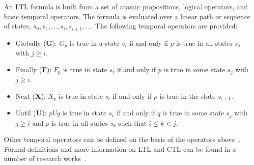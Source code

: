An LTL formula is built from a set of atomic propositions, logical operators, and basic temporal operators. The formula is evaluated over a linear path or sequence of states, $s_0, s_1, ..., s_i ,s_{i+1},...$. The following temporal operators are provided:
\begin{itemize}
    \item Globally (\textbf{G}): $G_p$ is true in a state $s_i$ if and only if $p$ is true in all states $s_j$ with $j \geq i$.
    
    \item Finally (\textbf{F}): $F_p$ is true in state $s_i$ if and only if $p$ is true in some state $s_j$ with $j \geq i$.
    
    \item Next (\textbf{X}): $X_p$ is true in state $s_i$ if and only if $p$ is true in the state $s_{i+1}$. 
    
    \item Until (\textbf{U}): $pUq$ is true in state $s_i$ if and only if $q$ is true in some state $s_j$ with $j \geq i$ and $p$ is true in all states $s_k$ such that $i \leq k < j$.
\end{itemize}

Other temporal operators can be defined on the basis of the operators above~\cite{sistla1985complexity}. Formal definitions and more information on LTL and CTL can be found in a number of research works~\cite{Bozzano:2010:DSA:1951720, clarke2018model}.